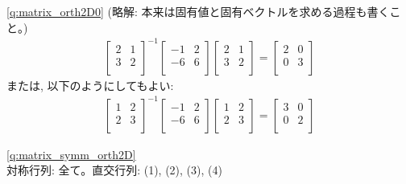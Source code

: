 %
\ref{q:matrix_orth2D0} (略解: 本来は固有値と固有ベクトルを求める過程も書くこと。)
\begin{eqnarray}
\begin{bmatrix}
2 & 1\\
3 & 2\\
\end{bmatrix}^{-1}
\begin{bmatrix}
-1 & 2 \\
-6 & 6 \\
\end{bmatrix}
\begin{bmatrix}
2 & 1\\
3 & 2\\
\end{bmatrix}
=\begin{bmatrix}
2 & 0 \\
0 & 3 \\
\end{bmatrix}
\end{eqnarray}
または, 以下のようにしてもよい:
\begin{eqnarray}
\begin{bmatrix}
1 & 2\\
2 & 3\\
\end{bmatrix}^{-1}
\begin{bmatrix}
-1 & 2 \\
-6 & 6 \\
\end{bmatrix}
\begin{bmatrix}
1 & 2\\
2 & 3\\
\end{bmatrix}
=\begin{bmatrix}
3 & 0 \\
0 & 2 \\
\end{bmatrix}
\end{eqnarray}
\mv

%
\ref{q:matrix_symm_orth2D}\\
対称行列: 全て。直交行列: (1), (2), (3), (4)\\


